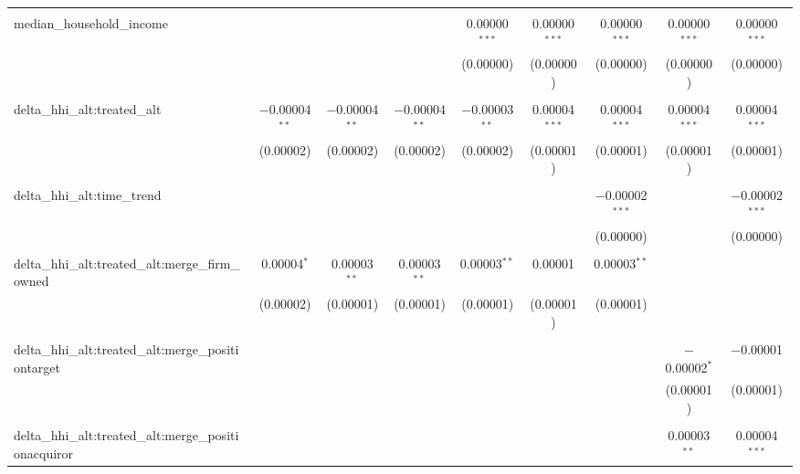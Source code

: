 \begin{table}[H]
{\begin{tabular}{@{\extracolsep{5pt}}lcccccccc}
   & & & & & & & & \\  

  median\_household\_income &  &  &  & 0.00000$^{***}$ & 0.00000$^{***}$ & 0.00000$^{***}$ & 0.00000$^{***}$ & 0.00000$^{***}$ \\  

   &  &  &  & (0.00000) & (0.00000) & (0.00000) & (0.00000) & (0.00000) \\  

   & & & & & & & & \\  

  delta\_hhi\_alt:treated\_alt & $-$0.00004$^{**}$ & $-$0.00004$^{**}$ & $-$0.00004$^{**}$ & $-$0.00003$^{**}$ & 0.00004$^{***}$ & 0.00004$^{***}$ & 0.00004$^{***}$ & 0.00004$^{***}$ \\  

   & (0.00002) & (0.00002) & (0.00002) & (0.00002) & (0.00001) & (0.00001) & (0.00001) & (0.00001) \\  

   & & & & & & & & \\  

  delta\_hhi\_alt:time\_trend &  &  &  &  &  & $-$0.00002$^{***}$ &  & $-$0.00002$^{***}$ \\  

   &  &  &  &  &  & (0.00000) &  & (0.00000) \\  

   & & & & & & & & \\  

  delta\_hhi\_alt:treated\_alt:merge\_firm\_owned & 0.00004$^{*}$ & 0.00003$^{**}$ & 0.00003$^{**}$ & 0.00003$^{**}$ & 0.00001 & 0.00003$^{**}$ &  &  \\  

   & (0.00002) & (0.00001) & (0.00001) & (0.00001) & (0.00001) & (0.00001) &  &  \\  

   & & & & & & & & \\  

  delta\_hhi\_alt:treated\_alt:merge\_positiontarget &  &  &  &  &  &  & $-$0.00002$^{*}$ & $-$0.00001 \\  

   &  &  &  &  &  &  & (0.00001) & (0.00001) \\  

   & & & & & & & & \\  

  delta\_hhi\_alt:treated\_alt:merge\_positionacquiror &  &  &  &  &  &  & 0.00003$^{**}$ & 0.00004$^{***}$ \\  


\end{tabular}}
\end{table}

